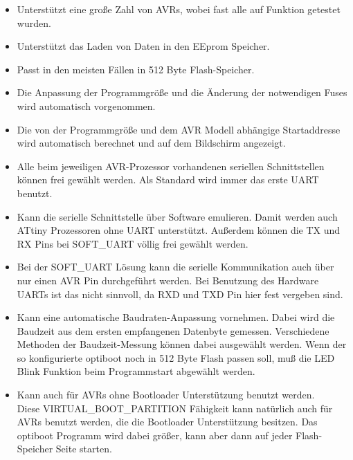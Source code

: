 \begin{itemize}

\item {Unterstützt eine große Zahl von AVRs, wobei fast alle auf Funktion getestet wurden.}

\item {Unterstützt das Laden von Daten in den EEprom Speicher.}

\item {Passt in den meisten Fällen in 512 Byte Flash-Speicher.}

\item {Die Anpassung der Programmgröße und die Änderung der notwendigen Fuses wird automatisch vorgenommen.}

\item {Die von der Programmgröße und dem AVR Modell abhängige Startaddresse wird
	automatisch berechnet und auf dem Bildschirm angezeigt.}

\item {Alle beim jeweiligen AVR-Prozessor vorhandenen seriellen Schnittstellen
	können frei gewählt werden. Als Standard wird immer das erste UART
	benutzt.}

\item {Kann die serielle Schnittstelle über Software emulieren.
	Damit werden auch ATtiny Prozessoren ohne UART unterstützt.
	Außerdem können die TX und RX Pins bei SOFT\_UART völlig frei gewählt werden.}

\item {Bei der SOFT\_UART Lösung kann die serielle Kommunikation auch über nur einen AVR Pin 
	durchgeführt werden. Bei Benutzung des Hardware UARTs ist das nicht sinnvoll, da RXD und TXD Pin
	hier fest vergeben sind.}

\item {Kann eine automatische Baudraten-Anpassung vornehmen.
	Dabei wird die Baudzeit aus dem ersten empfangenen Datenbyte gemessen. 
	Verschiedene Methoden der Baudzeit-Messung können dabei ausgewählt werden.
	Wenn der so konfigurierte optiboot noch in 512 Byte Flash passen soll,
	muß die LED Blink Funktion beim Programmstart abgewählt werden.}

\item {Kann auch für AVRs ohne Bootloader Unterstützung benutzt werden.\\
	Diese VIRTUAL\_BOOT\_PARTITION Fähigkeit kann natürlich auch
	für AVRs benutzt werden, die die Bootloader Unterstützung besitzen.
	Das optiboot Programm wird dabei größer, kann aber dann auf jeder
	Flash-Speicher Seite starten.}


\end{itemize}
